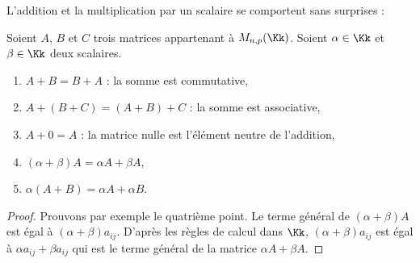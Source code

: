 \documentclass[class=report,crop=false]{standalone}
\begin{document}
L'addition et la multiplication par un scalaire se comportent sans surprises :
\begin{proposition}
Soient $A$, $B$ et $C$ trois matrices appartenant à $M_{n,p}(\Kk)$.
Soient $\alpha \in \Kk$ et $\beta \in \Kk$ deux scalaires.
\begin{enumerate}
  \item $A + B = B + A$ : la somme est commutative,
  \item $A + (B+C) = (A + B) + C$ : la somme est associative,
  \item $A + 0 = A$ : la matrice nulle est l'élément neutre de l'addition,
  \item $(\alpha + \beta )A =\alpha A + \beta A$,
  \item $\alpha (A+B)=\alpha A + \alpha B$.
\end{enumerate}
\end{proposition}

\begin{proof}
Prouvons par exemple le quatrième point.
Le terme général de $(\alpha + \beta ) A $ est égal à
$(\alpha + \beta)a_{ij}$. D'après les règles de calcul dans $\Kk$,
$(\alpha + \beta)a_{ij}$ est égal à  $\alpha a_{ij}+ \beta a_{ij}$
qui est le terme général de la matrice $\alpha A + \beta A$.
\end{proof}

\end{document}

